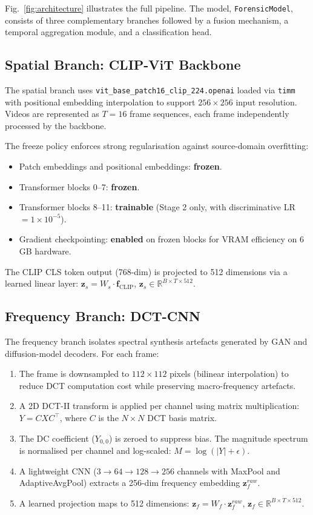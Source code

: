 \documentclass[journal]{IEEEtran}
\begin{document}
Fig.~\ref{fig:architecture} illustrates the full pipeline. The model, \texttt{ForensicModel}, consists of three complementary branches followed by a fusion mechanism, a temporal aggregation module, and a classification head.

\subsection{Spatial Branch: CLIP-ViT Backbone}
The spatial branch uses \texttt{vit\_base\_patch16\_clip\_224.openai} loaded via \texttt{timm} with positional embedding interpolation to support $256 \times 256$ input resolution. Videos are represented as $T=16$ frame sequences, each frame independently processed by the backbone.

The freeze policy enforces strong regularisation against source-domain overfitting:
\begin{itemize}
    \item Patch embeddings and positional embeddings: \textbf{frozen}.
    \item Transformer blocks 0--7: \textbf{frozen}.
    \item Transformer blocks 8--11: \textbf{trainable} (Stage 2 only, with discriminative LR $= 1 \times 10^{-5}$).
    \item Gradient checkpointing: \textbf{enabled} on frozen blocks for VRAM efficiency on 6 GB hardware.
\end{itemize}

The CLIP CLS token output (768-dim) is projected to 512 dimensions via a learned linear layer: $\mathbf{z}_s = W_s \cdot \mathbf{f}_\text{CLIP}$, $\mathbf{z}_s \in \mathbb{R}^{B \times T \times 512}$.

\subsection{Frequency Branch: DCT-CNN}
The frequency branch isolates spectral synthesis artefacts generated by GAN and diffusion-model decoders. For each frame:
\begin{enumerate}
    \item The frame is downsampled to $112 \times 112$ pixels (bilinear interpolation) to reduce DCT computation cost while preserving macro-frequency artefacts.
    \item A 2D DCT-II transform is applied per channel using matrix multiplication: $Y = C X C^\top$, where $C$ is the $N \times N$ DCT basis matrix.
    \item The DC coefficient ($Y_{0,0}$) is zeroed to suppress bias. The magnitude spectrum is normalised per channel and log-scaled: $M = \log(|Y| + \epsilon)$.
    \item A lightweight CNN ($3 \to 64 \to 128 \to 256$ channels with MaxPool and AdaptiveAvgPool) extracts a 256-dim frequency embedding $\mathbf{z}_f^{raw}$.
    \item A learned projection maps to 512 dimensions: $\mathbf{z}_f = W_f \cdot \mathbf{z}_f^{raw}$, $\mathbf{z}_f \in \mathbb{R}^{B \times T \times 512}$.
\end{enumerate}
\end{document}
